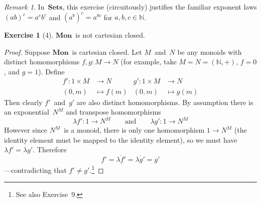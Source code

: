 \documentclass[letterpaper,12pt]{article}
\newcommand{\N}{\mathbb{N}}
\newcommand{\cat}[1]{\mathbf{#1}}
\newcommand{\curry}[1]{\lambda{#1}}
\newcommand{\uncurry}[1]{\overline{#1}}
\newcommand{\2}{\cat{2}}
\newcommand{\Sets}{\cat{Sets}}
\newcommand{\Mon}{\cat{Mon}}
\theoremstyle{definition}
\newtheorem*{exer}{Exercise}
\theoremstyle{remark}
\newtheorem*{rmk}{Remark}
\theoremstyle{direction}
\begin{document}
\begin{rmk}
In~\(\Sets\), this exercise (circuitously) justifies the familiar exponent laws \((ab)^c=a^cb^c\) and \((a^b)^c=a^{bc}\) for \(a,b,c\in\N\).
\end{rmk}

\begin{exer}[4]
\(\Mon\)~is not cartesian closed.
\end{exer}
\begin{proof}
Suppose \(\Mon\)~is cartesian closed. Let \(M\)~and~\(N\) be any monoids with distinct homomorphisms \(f,g:M\to N\) (for example, take \(M=N=(\N,+)\), \(f=0\), and \(g=1\)). Define
\begin{align*}
f':1\times M&\to N&g':1\times M&\to N\\
(0,m)&\mapsto f(m)&(0,m)&\mapsto g(m)
\end{align*}
Then clearly \(f'\)~and~\(g'\) are also distinct homomorphisms. By assumption there is an exponential~\(N^M\) and transpose homomorphisms
\[\curry{f'}:1\to N^M\qquad\text{and}\qquad\curry{g'}:1\to N^M\]
However since \(N^M\)~is a monoid, there is only one homomorphism \(1\to N^M\) (the identity element must be mapped to the identity element), so we must have \(\curry{f'}=\curry{g'}\). Therefore
\[f'=\uncurry{\curry{f'}}=\uncurry{\curry{g'}}=g'\]
---contradicting that \(f'\ne g'\).\footnote{See also Exercise~9.}
\end{proof}
\end{document}

